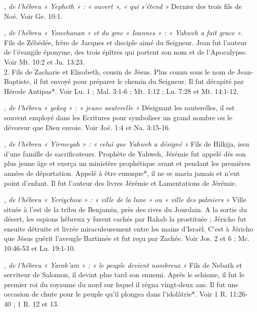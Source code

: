 \begin{multicols}{2}
\textit{, de l'hébreu « Yepheth » : « ouvert », « qui s'étend »}\newline
Dernier des trois fils de Noé. Voir Ge. 10:1.

\textit{, de l'hébreu « Yowchanan » et du grec « Ioannes » : « Yahweh a fait grace »}. Fils de Zébédée, frère de Jacques et disciple aimé du Seigneur. Jean fut l'auteur de l'évangile éponyme, des trois épîtres qui portent son nom et de l'Apocalypse. Voir Mt. 10:2 et Jn. 13:23.
\\2. Fils de Zacharie et Elisabeth, cousin de Jésus. Plus connu sous le nom de Jean-Baptiste, il fut envoyé pour préparer le chemin du Seigneur. Il fut décapité par Hérode Antipas*. Voir Lu. 1 ; Mal. 3:1-6 ; Mt. 1:12 ; Lu. 7:28 et Mt. 14:1-12.

\textit{, de l'hébreu « yekeq » : « jeune sauterelle »}\newline
Désignant les sauterelles, il est souvent employé dans les Ecritures pour symboliser un grand nombre ou le dévoreur que Dieu envoie. Voir Joë. 1:4 et Na. 3:15-16.

\textit{, de l'hébreu « Yirmeyah » : « celui que Yahweh a désigné »}\newline
Fils de Hilkija, issu d'une famille de sacrificateurs. Prophète de Yahweh, Jérémie fut appelé dès son plus jeune âge et exerça un ministère prophétique avant et pendant les premières années de déportation. Appelé à être eunuque*, il ne se maria jamais et n'eut point d'enfant. Il fut l'auteur des livres Jérémie et Lamentations de Jérémie.

\textit{, de l'hébreu « Yeriychow » : « ville de la lune » ou « ville des palmiers »}\newline
Ville située à l'est de la tribu de Benjamin, près des rives du Jourdain. A la sortie du désert, les espions hébreux y furent cachés par Rahab la prostituée ; Jéricho fut ensuite détruite et livrée miraculeusement entre les mains d'Israël. C'est à Jéricho que Jésus guérit l'aveugle Bartimée et fut reçu par Zachée. Voir Jos. 2 et 6 ; Mc. 10:46-53 et Lu. 19:1-10.

\textit{, de l'hébreu « Yarob'am » : « le peuple devient nombreux »}\newline
Fils de Nebath et serviteur de Salomon, il devint plus tard son ennemi. Après le schisme, il fut le premier roi du royaume du nord sur lequel il régna vingt-deux ans. Il fut une occasion de chute pour le peuple qu'il plongea dans l'idolâtrie*. Voir 1 R. 11:26-40 ; 1 R. 12 et 13.


\end{multicols}
